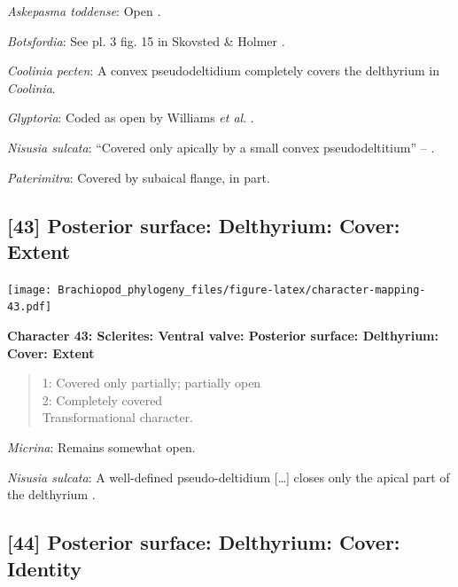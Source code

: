\documentclass[openany]{book}
\theoremstyle{definition}
\theoremstyle{definition}
\theoremstyle{definition}
\theoremstyle{remark}
\begin{document}
\hypertarget{Askepasma_toddense-coding-42}{}
\emph{Askepasma toddense}: Open \citep{Topper2013Theoldest}.

\hypertarget{Botsfordia-coding-42}{}
\emph{Botsfordia}: See pl. 3 fig. 15 in Skovsted \& Holmer
\citeyearpar{Skovsted2005EarlyCambrian}.

\hypertarget{Coolinia_pecten-coding-42}{}
\emph{Coolinia pecten}: A convex pseudodeltidium completely covers the
delthyrium in \emph{Coolinia}.

\hypertarget{Glyptoria-coding-42}{}
\emph{Glyptoria}: Coded as open by Williams \emph{et al}.
\citeyearpar{Williams1998Thediversity}.

\hypertarget{Nisusia_sulcata-coding-42}{}
\emph{Nisusia sulcata}: ``Covered only apically by a small convex
pseudodeltitium'' -- \citet{Holmer2018Evolutionarysignificance}.

\hypertarget{Paterimitra-coding-42}{}
\emph{Paterimitra}: Covered by subaical flange, in part.

\subsection*{{[}43{]} Posterior surface: Delthyrium: Cover:
Extent}\label{posterior-surface-delthyrium-cover-extent}

\texttt{[image: Brachiopod\_phylogeny\_files/figure-latex/character-mapping-43.pdf]}

\textbf{Character 43: Sclerites: Ventral valve: Posterior surface:
Delthyrium: Cover: Extent}

\begin{quote}
1: Covered only partially; partially open\\
2: Completely covered\\
Transformational character.
\end{quote}

\hypertarget{Micrina-coding-43}{}
\emph{Micrina}: Remains somewhat open.

\hypertarget{Nisusia_sulcata-coding-43}{}
\emph{Nisusia sulcata}: A well-defined pseudo-deltidium {[}\ldots{}{]}
closes only the apical part of\\
the delthyrium \citep{Rowell1985Theevolutionary}.

\subsection*{{[}44{]} Posterior surface: Delthyrium: Cover:
Identity}\label{posterior-surface-delthyrium-cover-identity}
\end{document}
